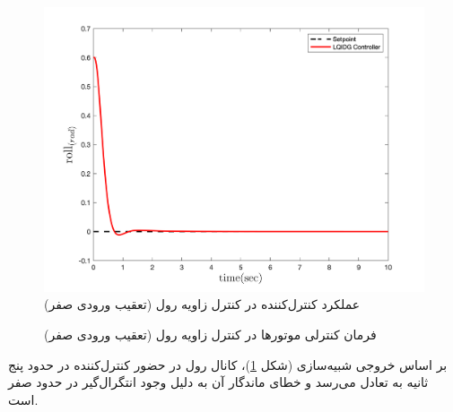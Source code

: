 \begin{figure}[H]
	\includegraphics[width=.48\linewidth]{../Figures/MIL/LQIDG/Roll/lqidg_rollnn_.png}
	\centering
	\caption{عملكرد کنترل‌کننده  در کنترل زاويه رول (تعقیب ورودی صفر)}
	\label{lqidg_roll_fig_simulation}
\end{figure}
\begin{figure}[H]
	\centering
	\caption{‫‪فرمان کنترلی موتورها در کنترل زاویه رول (تعقیب ورودی صفر)}
\end{figure}

بر اساس خروجی شبیه‌سازی (شکل
\ref{lqidg_roll_fig_simulation})،
کانال رول در حضور کنترل‌کننده  در حدود پنج ثانیه به تعادل می‌رسد و خطای ماندگار آن به دلیل وجود انتگرال‌گیر در حدود صفر است.